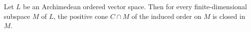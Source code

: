 Let $L$ be an Archimedean ordered vector space. Then for every finite-dimensional subspace $M$ of $L$, the positive cone $C \cap M$ of the induced order on $M$ is closed in $M$.
